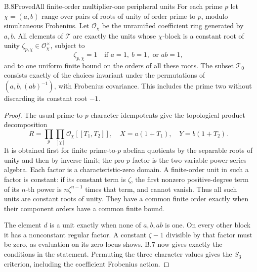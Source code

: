 \begin{statement}{B.8}{Proved}{All finite-order multiplier-one peripheral units}
For each prime $p$ let $\chi=(a,b)$ range over pairs of roots of
unity of order prime to $p$, modulo simultaneous Frobenius.
Let $\mathcal O_\chi$ be the unramified coefficient ring generated
by $a,b$. All elements of $\mathcal T$ are exactly the units whose
$\chi$-block is a constant root of unity
$\zeta_{p,\chi}\in\mathcal O_\chi^\times$, subject to
\[
 \zeta_{p,\chi}=1\quad\text{if }a=1,\ b=1,
                          \text{ or }ab=1,
\]
and to one uniform finite bound on the orders of all these roots.
The subset $\mathcal T_0$ consists exactly of the choices invariant
under the permutations of $(a,b,(ab)^{-1})$, with Frobenius
covariance. This includes the prime two without discarding its
constant root $-1$.
\end{statement}
\begin{proof}
The usual prime-to-$p$ character idempotents give the topological
product decomposition
\[
 R=\prod_p\prod_{[\chi]}
               \mathcal O_\chi[[T_1,T_2]],
 \quad X=a(1+T_1),\quad Y=b(1+T_2).
\]
It is obtained first for finite prime-to-$p$ abelian quotients
by the separable roots of unity and then by inverse limit; the
pro-$p$ factor is the two-variable power-series algebra.
Each factor is a characteristic-zero domain. A finite-order unit
in such a factor is constant: if its constant term is $\zeta$,
the first nonzero positive-degree term of its $n$-th power is
$n\zeta^{n-1}$ times that term, and cannot vanish. Thus all such
units are constant roots of unity. They have a common finite order
exactly when their component orders have a common finite bound.

The element $d$ is a unit exactly when none of $a,b,ab$ is one.
On every other block it has a nonconstant regular factor. A constant
$\zeta-1$ divisible by that factor must be zero, as evaluation on
its zero locus shows. B.7 now gives exactly the conditions in the
statement. Permuting the three character values gives the
$S_3$ criterion, including the coefficient Frobenius action.
\end{proof}

